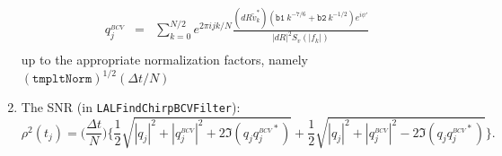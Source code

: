 \begin{enumerate}
\begin{eqnarray}
q^{{}_{BCV}}_j &=& \sum_{k=0}^{N/2}e^{ 2 \pi i j k/N} \frac{(dR \tilde{v}_k 
^{\ast})( \mathtt{b1} \:k^{-7/6} + \mathtt{b2}\: k^{-1/2} ) e^{i \psi'}}
	{|dR|^2 S_v(|f_k|)} \\
\end{eqnarray}
up to the appropriate normalization factors, namely $(\mathtt{tmpltNorm}) 
^{1/2}( \Delta t/N)$
\item The SNR (in \texttt{LALFindChirpBCVFilter}):
\begin{equation}
\rho^2(t_j) = \Big ( \frac{\Delta t}{N} \Big ) \bigg \{ \frac{1}{2} 
	\sqrt{ |q_j|^2 + |q^{{}_{BCV}}_j|^2 + 2 \Im (q_j q^{{}_{BCV}\ast}_j) } +
	\frac{1}{2}\sqrt{|q_j|^2+|q^{{}_{BCV}}_j|^2 - 
	2 \Im (q_j q^{{}_{BCV} \ast}_j) }
	\bigg \}. 
\end{equation}
\end{enumerate}

